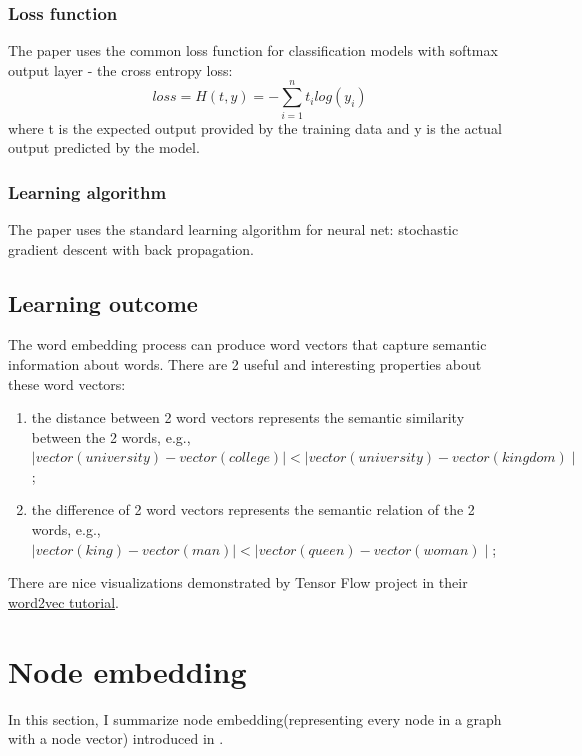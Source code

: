 \documentclass{article}
\begin{document}
\subsubsection{Loss function}
The paper uses the common loss function for classification models with softmax output layer - the cross entropy loss:
\begin{equation}
loss = H(t, y) = - \sum_{i = 1}^{n} t_i log(y_i)
\end{equation}
where t is the expected output provided by the training data and y is the actual output predicted by the model.

\subsubsection{Learning algorithm}
The paper uses the standard learning algorithm for neural net: stochastic gradient descent with back propagation\cite{lecun2012efficient}.

\subsection{Learning outcome}
The word embedding process can produce word vectors that capture semantic information about words. There are 2 useful and interesting properties about these word vectors:
\begin{enumerate}
	\item the distance between 2 word vectors represents the semantic similarity between the 2 words, e.g., $ \mid vector(university) - vector(college) \mid < \mid vector(university) - vector(kingdom) \mid $;
	\item the difference of 2 word vectors represents the semantic relation of the 2 words, e.g., $ \mid vector(king) - vector(man) \mid < \mid vector(queen) - vector(woman) \mid $;
\end{enumerate}
There are nice visualizations demonstrated by Tensor Flow project in their \href{https://www.tensorflow.org/versions/r0.7/tutorials/word2vec/index.html}{word2vec tutorial}.

\section{Node embedding}
In this section, I summarize node embedding(representing every node in a graph with a node vector) introduced in \cite{perozzi2014deepwalk}.
\end{document}
